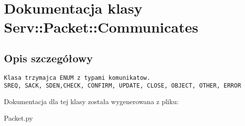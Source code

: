 \hypertarget{class_serv_1_1_packet_1_1_communicates}{
\section{Dokumentacja klasy Serv::Packet::Communicates}
\label{class_serv_1_1_packet_1_1_communicates}
}


\subsection{Opis szczegółowy}


\footnotesize\begin{verbatim}Klasa trzymajca ENUM z typami komunikatow.
SREQ, SACK, SDEN,CHECK, CONFIRM, UPDATE, CLOSE, OBJECT, OTHER, ERROR
\end{verbatim}
\normalsize
 

Dokumentacja dla tej klasy została wygenerowana z pliku:\begin{CompactItemize}
\item 
Packet.py\end{CompactItemize}
